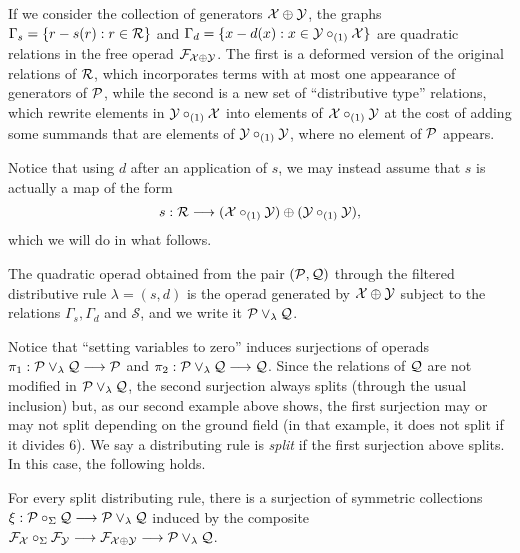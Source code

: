 If we consider the collection  of generators 
$\mathcal{X}\oplus \mathcal{Y}$, the graphs $\Gamma_s  = \{ r - s(r) : r\in\mathcal{R}\}$ and $\Gamma_d = \{
x - d(x) : x\in \mathcal{Y}\circ_{(1)} \mathcal{X}\}$
are quadratic relations in the free
operad $\mathcal{F}_{\mathcal{X}\oplus \mathcal{Y}}$. The first
is a deformed version of the original relations
of $\mathcal{R}$, which incorporates terms with
at most one appearance of generators of $\mathcal P$, while the second is a new set
of ``distributive type'' relations, which
rewrite elements in $\mathcal{Y}\circ_{(1)}\mathcal{X}$
into elements of $\mathcal{X}\circ_{(1)}\mathcal{Y}$
at the cost of adding some
summands that are 
elements of $\mathcal{Y}\circ_{(1)}\mathcal{Y}$,
where no element of $\mathcal P$ appears.

Notice that using $d$
after an application of $s$, we may instead
assume that $s$ is actually a map
of the form 
\[
s : \mathcal{R} \longrightarrow (\mathcal{X}\circ_{(1)}\mathcal{Y})
				\oplus (\mathcal{Y} \circ_{(1)}\mathcal{Y}),\]
which we will do in what follows.
\begin{definition}
The quadratic operad 
obtained from the pair $(\mathcal P,\mathcal{Q})$
through the filtered distributive rule
$\lambda = (s,d)$ is the operad generated
by $\mathcal{X}\oplus \mathcal{Y}$ subject to the relations
$\Gamma_s,\Gamma_d$ and $\mathcal S$,
and we write it $\mathcal P\vee_\lambda \mathcal{Q}$.
\end{definition}

Notice that ``setting variables to zero''
induces surjections of operads
$\pi_1 : \mathcal P\vee_\lambda \mathcal{Q}\longrightarrow \mathcal P$
and $\pi_2: \mathcal P\vee_\lambda \mathcal{Q}\longrightarrow \mathcal{Q}$.
Since the relations of $\mathcal{Q}$ are
not modified in $\mathcal P\vee_\lambda \mathcal{Q}$, the
second surjection always splits (through
the usual inclusion) but,
as our second example above shows,
the first surjection may or may not
split depending on the ground field
(in that example, it does not split
if it divides $6$). 
We say a distributing rule is
\emph{split} if the first
surjection above splits. 
In this case, the following holds.

\begin{lemma}
For every split distributing rule,
there is a surjection of symmetric
collections
$\xi: \mathcal P\circ_\Sigma \mathcal{Q} 
\longrightarrow \mathcal {\mathcal P}\vee_\lambda \mathcal{Q}
$  induced by the composite
$\mathcal{F}_{\mathcal{X}}\circ_\Sigma\mathcal{F}_{\mathcal{Y}}\longrightarrow
\mathcal{F}_{\mathcal{X}\oplus \mathcal{Y}} 
\longrightarrow \mathcal {\mathcal P}\vee_\lambda \mathcal{Q}$.
\end{lemma}

